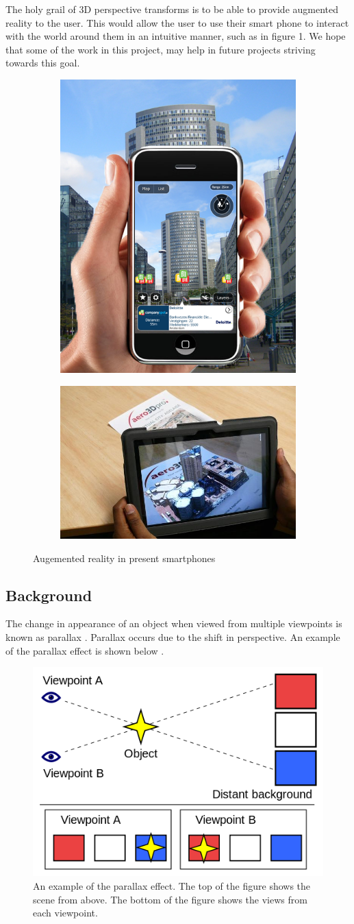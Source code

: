 \documentclass[12pt,twocolumn,letterpaper]{article}
\begin{document}
The holy grail of 3D perspective transforms is to be able to provide augmented reality to the user.  This would allow the user to use their smart phone to interact with the world around them in an intuitive manner, such as in figure 1.  We hope that some of the work in this project, may help in future projects striving towards this goal.

\begin{figure}
\centering
\begin{subfigure}{0.22\textwidth}
\includegraphics[height=35 mm]{AR_now}
\end{subfigure}
\begin{subfigure}{0.22\textwidth}
\includegraphics[height=25 mm]{AR_now1}
\end{subfigure}
\caption{Augemented reality in present smartphones}
\label{fig:arnow}
\end{figure}

\subsection{Background}

The change in appearance of an object when viewed from multiple viewpoints is known as parallax \cite{Szeliski}.  Parallax occurs due to the shift in perspective.  An example of the parallax effect is shown below \cite{Wikipedia}.

\begin{figure}[!htbp]
\centering
\includegraphics[height=30 mm]{parallax.png}
\caption{An example of the parallax effect.  The top of the figure shows the scene from above.  The bottom of the figure shows the views from each viewpoint.}
\end{figure}
\end{document}
